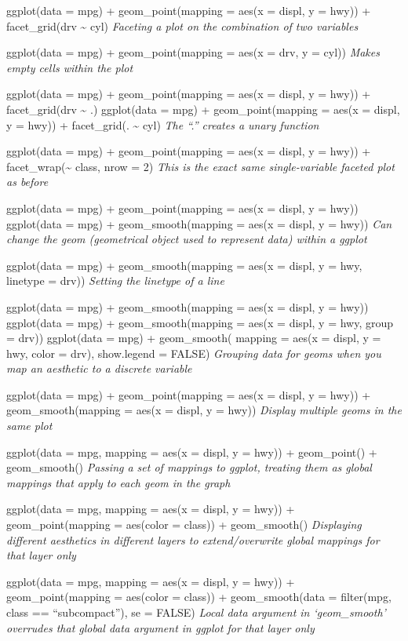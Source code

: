 \documentclass[
]{article}
\begin{document}
ggplot(data = mpg) + geom\_point(mapping = aes(x = displ, y = hwy)) +
facet\_grid(drv \textasciitilde{} cyl) \emph{Faceting a plot on the
combination of two variables}

ggplot(data = mpg) + geom\_point(mapping = aes(x = drv, y = cyl))
\emph{Makes empty cells within the plot}

ggplot(data = mpg) + geom\_point(mapping = aes(x = displ, y = hwy)) +
facet\_grid(drv \textasciitilde{} .) ggplot(data = mpg) +
geom\_point(mapping = aes(x = displ, y = hwy)) + facet\_grid(.
\textasciitilde{} cyl) \emph{The ``.'' creates a unary function}

ggplot(data = mpg) + geom\_point(mapping = aes(x = displ, y = hwy)) +
facet\_wrap(\textasciitilde{} class, nrow = 2) \emph{This is the exact
same single-variable faceted plot as before}

ggplot(data = mpg) + geom\_point(mapping = aes(x = displ, y = hwy))
ggplot(data = mpg) + geom\_smooth(mapping = aes(x = displ, y = hwy))
\emph{Can change the geom (geometrical object used to represent data)
within a ggplot}

ggplot(data = mpg) + geom\_smooth(mapping = aes(x = displ, y = hwy,
linetype = drv)) \emph{Setting the linetype of a line}

ggplot(data = mpg) + geom\_smooth(mapping = aes(x = displ, y = hwy))
ggplot(data = mpg) + geom\_smooth(mapping = aes(x = displ, y = hwy,
group = drv)) ggplot(data = mpg) + geom\_smooth( mapping = aes(x =
displ, y = hwy, color = drv), show.legend = FALSE) \emph{Grouping data
for geoms when you map an aesthetic to a discrete variable}

ggplot(data = mpg) + geom\_point(mapping = aes(x = displ, y = hwy)) +
geom\_smooth(mapping = aes(x = displ, y = hwy)) \emph{Display multiple
geoms in the same plot}

ggplot(data = mpg, mapping = aes(x = displ, y = hwy)) + geom\_point() +
geom\_smooth() \emph{Passing a set of mappings to ggplot, treating them
as global mappings that apply to each geom in the graph}

ggplot(data = mpg, mapping = aes(x = displ, y = hwy)) +
geom\_point(mapping = aes(color = class)) + geom\_smooth()
\emph{Displaying different aesthetics in different layers to
extend/overwrite global mappings for that layer only}

ggplot(data = mpg, mapping = aes(x = displ, y = hwy)) +
geom\_point(mapping = aes(color = class)) + geom\_smooth(data =
filter(mpg, class == ``subcompact''), se = FALSE) \emph{Local data
argument in `geom\_smooth' overrudes that global data argument in ggplot
for that layer only}
\end{document}
